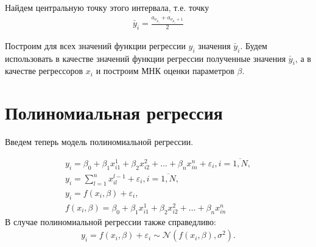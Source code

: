Найдем центральную точку этого интервала, т.е. точку
\begin{eqnarray}
    \check{y_i} = \frac{a_{\nu_{\mu_i}} + a_{\nu_{\mu_i}+1}}{2}
\end{eqnarray}

Построим для всех значений функции регрессии $y_i$ значения $\check{y_i}$.
Будем использовать в качестве значений функции регрессии полученные значения $\check{y_i}$, а в качестве регрессоров $x_i$ и построим МНК оценки параметров $\beta$.

\newpage
\section{Полиномиальная регрессия}
Введем теперь модель полиномиальной регрессии.

\begin{equation}
    \begin{array}{c}
        \label{eq28}y_i=\beta_0+\beta_1 x_{i1}^1+\beta_2 x_{i2}^2+\dots+\beta_n x_{in}^n+\varepsilon_i, i=\overline{1,N},\\
        y_i = \sum\limits_{l=1}^{n} x_{il}^{l-1} + \varepsilon_i, i=\overline{1,N},\\
        y_i= f(x_i,\beta)+\varepsilon_i,\\
        f(x_i,\beta)=\beta_0+\beta_1 x_{i1}^1+\beta_2 x_{i2}^2+\dots+\beta_n x_{in}^n
    \end{array}
\end{equation}
В случае полиномиальной регрессии также справедливо:
\begin{eqnarray}
    y_i=f(x_i,\beta)+\varepsilon_i \sim \mathcal{N}(f(x_i,\beta),\sigma^2).
\end{eqnarray}

